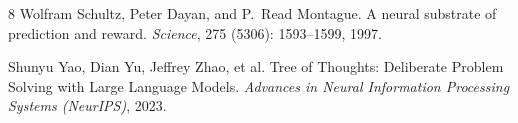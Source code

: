 \documentclass{article}
\begin{document}
\begin{thebibliography}{8}
Wolfram Schultz, Peter Dayan, and P.~Read Montague.
\newblock A neural substrate of prediction and reward.
\newblock \emph{Science}, 275 (5306): 1593--1599, 1997.

Shunyu Yao, Dian Yu, Jeffrey Zhao, et al.
\newblock Tree of Thoughts: Deliberate Problem Solving with Large Language Models.
\newblock \emph{Advances in Neural Information Processing Systems (NeurIPS)}, 2023.

\end{thebibliography}
\end{document}
